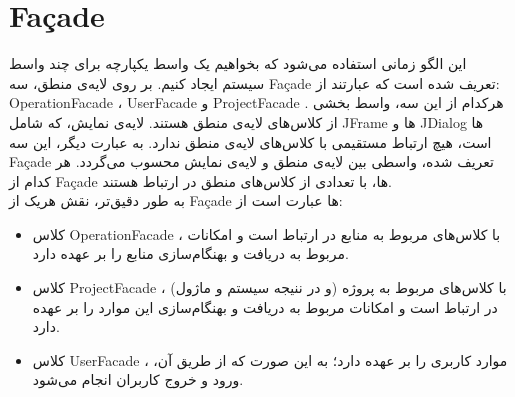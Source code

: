 \section{Façade}
این الگو زمانی استفاده می‌شود که بخواهیم یک واسط یکپارچه برای چند واسط سیستم ایجاد کنیم. بر روی لایه‌ی منطق، سه Façade تعریف شده است که عبارتند از: OperationFacade ،‌ UserFacade و ProjectFacade . هرکدام از این سه، واسط بخشی از کلاس‌های لایه‌ی منطق هستند. لایه‌ی نمایش، که شامل JFrame‌ ها و JDialog ها است، هیچ ارتباط مستقیمی با کلاس‌های لایه‌ی منطق ندارد. به عبارت دیگر، این سه Façade تعریف شده، واسطی بین لایه‌ی منطق و لایه‌ی نمایش محسوب می‌گردد. هر کدام از Façade ها، با تعدادی از کلاس‌های منطق در ارتباط هستند.\\
به طور دقیق‌تر، نقش هریک از  Façade ها عبارت است از:
\begin{itemize}
\item
کلاس OperationFacade ، با کلاس‌های مربوط به منابع در ارتباط است و امکانات مربوط به دریافت و بهنگام‌سازی منابع را بر عهده دارد.
\item
کلاس ProjectFacade ، با کلاس‌های مربوط به پروژه (و در ننیجه سیستم و ماژول) در ارتباط است و امکانات مربوط به دریافت و بهنگام‌سازی این موارد را بر عهده دارد.
\item
کلاس UserFacade ، موارد کاربری را بر عهده دارد؛ به این صورت که از طریق آن، ورود و خروج کاربران انجام می‌شود.
\end{itemize}
\restoregeometry